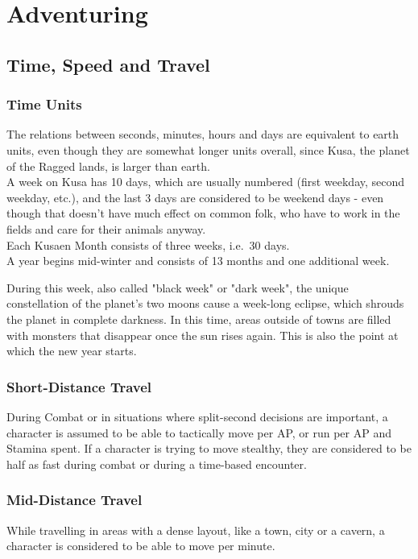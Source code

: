 \chapter{Adventuring}\label{ch:Adventuring}
\section{Time, Speed and Travel}\label{sec:timeSpeedTravel}
\subsection{Time Units}\label{subsec:timeUnits}
The relations between seconds, minutes, hours and days are equivalent to earth units, even though they are somewhat longer units overall, since Kusa, the planet of the Ragged lands, is larger than earth.\\

A week on Kusa has 10 days, which are usually numbered (first weekday, second weekday, etc.), and the last 3 days are considered to be weekend days - even though that doesn't have much effect on common folk, who have to work in the fields and care for their animals anyway.\\

Each Kusaen Month consists of three weeks, i.e.\ 30 days.\\

A year begins mid-winter and consists of 13 months and one additional week.

During this week, also called "black week" or "dark week", the unique constellation of the planet's two moons cause a week-long eclipse, which shrouds the planet in complete darkness.
In this time, areas outside of towns are filled with monsters that disappear once the sun rises again.
This is also the point at which the new year starts.\\

\subsection{Short-Distance Travel}\label{subsec:shortDistanceTravel}
During Combat or in situations where split-second decisions are important, a character is assumed to be able to tactically move  per AP, or run  per AP and Stamina spent.
If a character is trying to move stealthy, they are considered to be half as fast during combat or during a time-based encounter.\\

\subsection{Mid-Distance Travel}\label{subsec:midDistanceTravel}
While travelling in areas with a dense layout, like a town, city or a cavern, a character is considered to be able to move  per minute.

